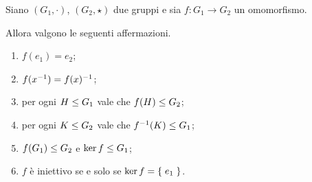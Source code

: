\begin{proposition}
     \label{prop:prop_omo}
    Siano $(G_1, \cdot)$, $(G_2, \star)$ due gruppi e sia $f : G_1 \to G_2$ un omomorfismo.

    Allora valgono le seguenti affermazioni.
    \begin{enumerate}[label={(\roman*)}, ref={\theproposition: (\roman*)}]
        \item \label{prop:prop_omo:e_va_in_e'}$f(e_1) = e_2$;
        \item \label{prop:prop_omo:inv_passa_dentro}$f(x^{-1}) = f(x)^{-1}$;
        \item \label{prop:prop_omo:f(H)_sgr_cod} per ogni $H \leq G_1$ vale che $f(H) \leq G_2$;
        \item \label{prop:prop_omo:f\inv(K)_sgr_dom}  per ogni $K \leq G_2$ vale che $f^{-1}(K) \leq G_1$;
        \item \label{prop:prop_omo:imm_ker_sgr}$f(G_1) \leq G_2$ e $\ker f \leq G_1$;
        \item \label{prop:prop_omo:cond_iniett}$f$ è iniettivo se e solo se $\ker f = \left\{\;e_1\;\right\}$.
    \end{enumerate}
\end{proposition}
